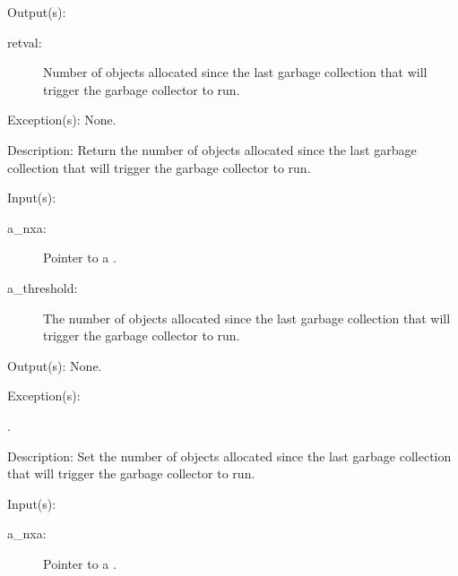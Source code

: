 \begin{capi}
\begin{capilist}
\begin{description}
		\end{description}
	\item[Output(s): ]
		\begin{description}\item[]
		\item[retval: ]
			Number of objects allocated since the last garbage
			collection that will trigger the garbage collector to
			run.
		\end{description}
	\item[Exception(s): ] None.
	\item[Description: ]
		Return the number of objects allocated since the last garbage
		collection that will trigger the garbage collector to run.
	\end{capilist}
\label{nxa_threshold_set}
	\begin{capilist}
	\item[Input(s): ]
		\begin{description}\item[]
		\item[a\_nxa: ]
			Pointer to a .
		\item[a\_threshold: ]
			The number of objects allocated since the last garbage
			collection that will trigger the garbage collector to
			run.
		\end{description}
	\item[Output(s): ] None.
	\item[Exception(s): ]
		\begin{description}\item[]
		\item[.]
		\end{description}
	\item[Description: ]
		Set the number of objects allocated since the last garbage
		collection that will trigger the garbage collector to run.
	\end{capilist}
\label{nxa_collections_get}
	\begin{capilist}
	\item[Input(s): ]
		\begin{description}\item[]
		\item[a\_nxa: ]
			Pointer to a \classname{nxa}.

\end{description}
\end{capilist}
\end{capi}
